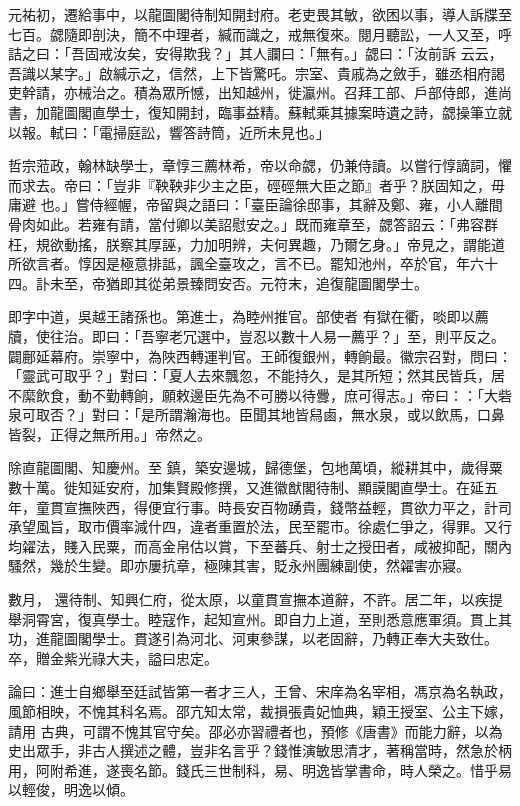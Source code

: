 \begin{pinyinscope}
 元祐初，遷給事中，以龍圖閣待制知開封府。老吏畏其敏，欲困以事，導人訴牒至七百。勰隨即剖決，簡不中理者，緘而識之，戒無復來。閱月聽訟，一人又至，呼詰之曰：「吾固戒汝矣，安得欺我？」其人讕曰：「無有。」勰曰：「汝前訴
 云云，吾識以某字。」啟緘示之，信然，上下皆驚吒。宗室、貴戚為之斂手，雖丞相府謁吏幹請，亦械治之。積為眾所憾，出知越州，徙瀛州。召拜工部、戶部侍郎，進尚書，加龍圖閣直學士，復知開封，臨事益精。蘇軾乘其據案時遺之詩，勰操筆立就以報。軾曰：「電掃庭訟，響答詩筒，近所未見也。」



 哲宗蒞政，翰林缺學士，章惇三薦林希，帝以命勰，仍兼侍讀。以嘗行惇謫詞，懼而求去。帝曰：「豈非『鞅鞅非少主之臣，硜硜無大臣之節』者乎？朕固知之，毋庸避
 也。」嘗侍經幄，帝留與之語曰：「臺臣論徐邸事，其辭及鄭、雍，小人離間骨肉如此。若雍有請，當付卿以美詔慰安之。」既而雍章至，勰答詔云：「弗容群枉，規欲動搖，朕察其厚誣，力加明辨，夫何異趣，乃爾乞身。」帝見之，謂能道所欲言者。惇因是極意排詆，諷全臺攻之，言不已。罷知池州，卒於官，年六十四。訃未至，帝猶即其從弟景臻問安否。元符末，追復龍圖閣學士。



 即字中道，吳越王諸孫也。第進士，為睦州推官。部使者
 有獄在衢，啖即以薦牘，使往治。即曰：「吾寧老冗選中，豈忍以數十人易一薦乎？」至，則平反之。闢鄜延幕府。崇寧中，為陜西轉運判官。王師復銀州，轉餉最。徽宗召對，問曰：「靈武可取乎？」對曰：「夏人去來飄忽，不能持久，是其所短；然其民皆兵，居不縻飲食，動不勤轉餉，願敕邊臣先為不可勝以待釁，庶可得志。」帝曰：：「大砦泉可取否？」對曰：「是所謂瀚海也。臣聞其地皆舄鹵，無水泉，或以飲馬，口鼻皆裂，正得之無所用。」帝然之。



 除直龍圖閣、知慶州。至
 鎮，築安邊城，歸德堡，包地萬頃，縱耕其中，歲得粟數十萬。徙知延安府，加集賢殿修撰，又進徽猷閣待制、顯謨閣直學士。在延五年，童貫宣撫陜西，得便宜行事。時長安百物踴貴，錢幣益輕，貫欲力平之，計司承望風旨，取市價率減什四，違者重置於法，民至罷市。徐處仁爭之，得罪。又行均糴法，賤入民粟，而高金帛估以賞，下至蕃兵、射士之授田者，咸被抑配，關內騷然，幾於生變。即亦屢抗章，極陳其害，貶永州團練副使，然糴害亦寢。



 數月，
 還待制、知興仁府，從太原，以童貫宣撫本道辭，不許。居二年，以疾提舉洞霄宮，復真學士。睦寇作，起知宣州。即自力上道，至則悉意應軍須。貫上其功，進龍圖閣學士。貫遂引為河北、河東參謀，以老固辭，乃轉正奉大夫致仕。卒，贈金紫光祿大夫，謚曰忠定。



 論曰：進士自鄉舉至廷試皆第一者才三人，王曾、宋庠為名宰相，馮京為名執政，風節相映，不愧其科名焉。邵亢知太常，裁損張貴妃恤典，穎王授室、公主下嫁，請用
 古典，可謂不愧其官守矣。邵必亦習禮者也，預修《唐書》而能力辭，以為史出眾手，非古人撰述之體，豈非名言乎？錢惟演敏思清才，著稱當時，然急於柄用，阿附希進，遂喪名節。錢氏三世制科，易、明逸皆掌書命，時人榮之。惜乎易以輕俊，明逸以傾。



\end{pinyinscope}